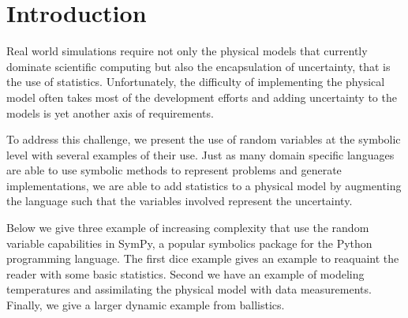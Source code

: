 \section{Introduction}

Real world simulations require not only the physical models that currently
dominate scientific computing but also the encapsulation of uncertainty, that
is the use of statistics.  Unfortunately, the difficulty of implementing the
physical model often takes most of the development efforts and adding
uncertainty to the models is yet another axis of requirements.

To address this challenge, we present the use of random variables at the
symbolic level with several examples of their use.  Just as many domain
specific languages are able to use symbolic methods to represent problems and
generate implementations, we are able to add statistics to a physical model by
augmenting the language such that the variables involved represent the
uncertainty.

Below we give three example of increasing complexity that use the random
variable capabilities in SymPy, a popular symbolics package for the Python
programming language.  The first dice example gives an example to reaquaint the
reader with some basic statistics.  Second we have an example of modeling
temperatures and assimilating the physical model with data
measurements. Finally, we give a larger dynamic example from ballistics.
